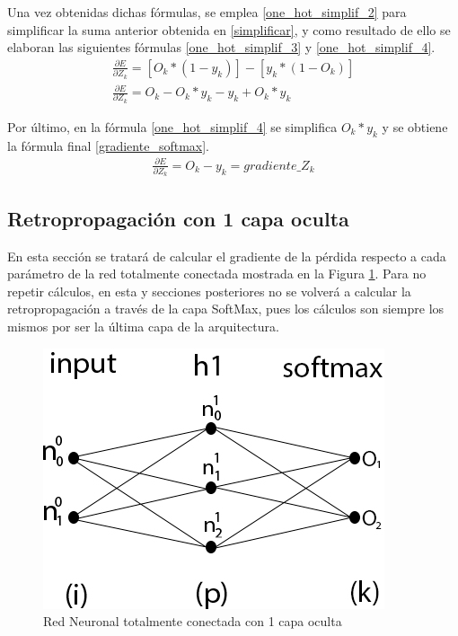 Una vez obtenidas dichas fórmulas, se emplea \ref{one_hot_simplif_2} para simplificar la suma anterior obtenida en \ref{simplificar}, y como resultado de ello se elaboran las siguientes fórmulas \ref{one_hot_simplif_3} y \ref{one_hot_simplif_4}. \\


\begin{gather}
	\frac{\partial E}{\partial Z_k} = [O_k*(1-y_k)] - [y_k*(1-O_k)] \label{one_hot_simplif_3} \\
	\frac{\partial E}{\partial Z_k} = O_k - O_k * y_k - y_k + O_k * y_k  \label{one_hot_simplif_4}
\end{gather}

Por último, en la fórmula \ref{one_hot_simplif_4} se simplifica $O_k*y_k$ y se obtiene la fórmula final \ref{gradiente_softmax}. \\
\begin{gather}
	\frac{\partial E}{\partial Z_k} = O_k - y_k = gradiente\_Z_k
	\label{gradiente_softmax}
\end{gather}

\subsection{Retropropagación con 1 capa oculta \cite{NN_backpropagation} \cite{NN_backprop_2} \label{backprop_1_capa}}

En esta sección se tratará de calcular el gradiente de la pérdida respecto a cada parámetro de la red totalmente conectada mostrada en la Figura \ref{fig:nn_1_capa}. Para no repetir cálculos, en esta y secciones posteriores no se volverá a calcular la retropropagación a través de la capa SoftMax, pues los cálculos son siempre los mismos por ser la última capa de la arquitectura.

\begin{figure}[H]
	\centering
	\includegraphics[scale=0.35]{imagenes/nn_1_capa.jpg}  
	\caption{Red Neuronal totalmente conectada con 1 capa oculta}
	\label{fig:nn_1_capa}
\end{figure}

